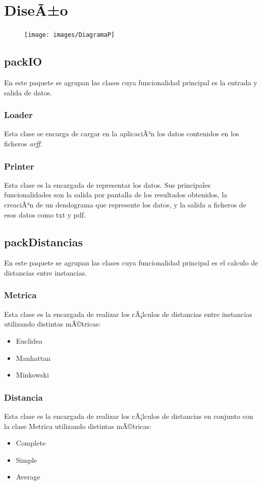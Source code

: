 \documentclass[11pt, titlepage,a4paper]{article}
\begin{document}
\section{DiseÃ±o}
\begin{figure}[hbtp]
\centering
\texttt{[image: images/DiagramaP]}
\end{figure}

\subsection{packIO}
En este paquete se agrupan las clases cuya funcionalidad principal es la entrada
y salida de datos.

\subsubsection{Loader}
Esta clase se encarga de cargar en la aplicaciÃ³n los datos contenidos en los
ficheros \textit{arff}.

\subsubsection{Printer}
Esta clase es la encargada de representar los datos. Sus principales
funcionalidades son la salida por pantalla de los resultados obtenidos, la
creaciÃ³n de un dendograma que represente los datos, y la salida a ficheros de
esos datos como txt y pdf.

\subsection{packDistancias}
\label{packDistancias}
En este paquete se agrupan las clases cuya funcionalidad principal es el calculo
de distancias entre instancias.

\subsubsection{Metrica}
Esta clase es la encargada de realizar los cÃ¡lculos de distancias entre
instancias utilizando distintas mÃ©tricas:
\begin{itemize}
  \item Euclidea
  \item Manhattan
  \item Minkowski
\end{itemize}

\subsubsection{Distancia}
Esta clase es la encargada de realizar los cÃ¡lculos de distancias en conjunto
con la clase Metrica utilizando distintas mÃ©tricas:
\begin{itemize}
  \item Complete
  \item Simple
  \item Average
\end{itemize}
\end{document}
